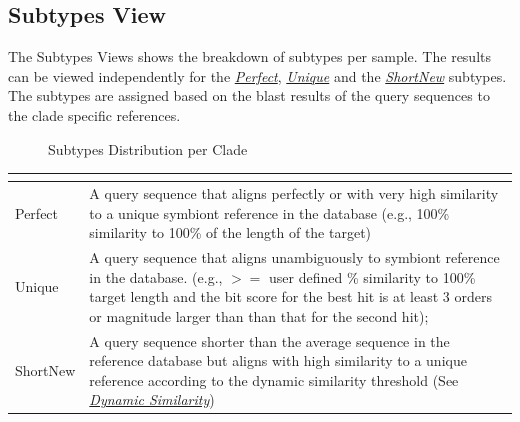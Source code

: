 \documentclass[letterpaper,10pt,english]{sphinxmanual}
\begin{document}
\subsection{Subtypes View}
\label{Web:subtypes-view}
The Subtypes Views shows the breakdown of subtypes per sample. The results
can be viewed independently for the {\hyperref[defs:perfect]{\emph{Perfect}}}, {\hyperref[defs:unique]{\emph{Unique}}} and the
{\hyperref[defs:shortnew]{\emph{ShortNew}}} subtypes. The subtypes are assigned based on the blast results of the query sequences to
the clade specific references.
\begin{figure}[htbp]
\centering
\capstart

\caption{Subtypes Distribution per Clade}\end{figure}

\begin{tabulary}{\linewidth}{|L|L|}
\hline
\textsf{\relax } & \textsf{\relax }\\
\hline
Perfect
 & 
A query sequence that aligns perfectly or with very high similarity to a unique symbiont reference in the database (e.g., 100\% similarity to 100\% of the length of the target)
\\

Unique
 & 
A query sequence that aligns unambiguously to symbiont reference in the database. (e.g., \(>=\) user defined \%
similarity to 100\% target length and the bit score for the best hit is at least 3 orders or magnitude larger than than that for the second hit);
\\

ShortNew
 & 
A query sequence shorter than the average sequence in the reference database
but aligns with high similarity to a unique reference according to the dynamic similarity threshold (See {\hyperref[defs:dynamic-similarity]{\emph{Dynamic Similarity}}})
\\
\hline\end{tabulary}
\end{document}
